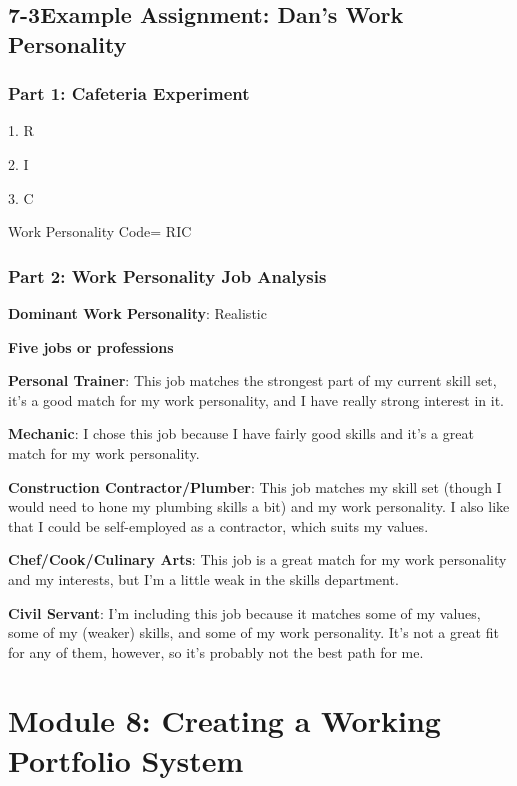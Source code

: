 \pagebreak \subsection*{7-3\quad Example Assignment: Dan's Work Personality}
\subsubsection*{Part 1: Cafeteria Experiment}

1. R

2. I

3. C

Work Personality Code= RIC

\subsubsection*{Part 2: Work Personality Job Analysis}
\textbf{Dominant Work Personality}: Realistic

\textbf{Five jobs or professions}

\textbf{Personal Trainer}: This job matches the strongest part of my current skill set, it's a good match for my work personality, and I have really strong interest in it.

\textbf{Mechanic}: I chose this job because I have fairly good skills and it's a great match for my work personality.

\textbf{Construction Contractor/Plumber}: This job matches my skill set (though I would need to hone my plumbing skills a bit) and my work personality. I also like that I could be self-employed as a contractor, which suits my values.

\textbf{Chef/Cook/Culinary Arts}: This job is a great match for my work personality and my interests, but I'm a little weak in the skills department.

\textbf{Civil Servant}: I'm including this job because it matches some of my values, some of my (weaker) skills, and some of my work personality. It's not a great fit for any of them, however, so it's probably not the best path for me.
 
\pagebreak \section*{Module 8:	Creating a Working Portfolio System}
\noindent\makebox[\textwidth]{\rule{\linewidth}{0.4pt}} 
\localtableofcontents 
\noindent\makebox[\textwidth]{\rule{\linewidth}{0.4pt}} 


